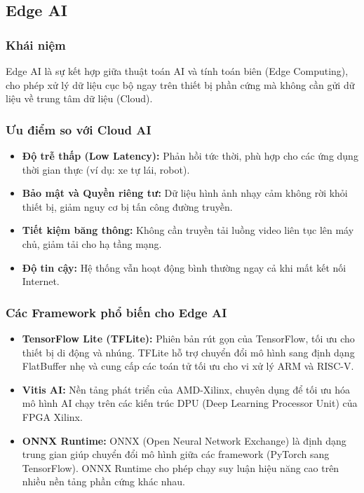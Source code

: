 \subsection{Edge AI}

\subsubsection{Khái niệm}
Edge AI là sự kết hợp giữa thuật toán AI và tính toán biên (Edge Computing), cho phép xử lý dữ liệu cục bộ ngay trên thiết bị phần cứng mà không cần gửi dữ liệu về trung tâm dữ liệu (Cloud).

\subsubsection{Ưu điểm so với Cloud AI}
\begin{itemize}
    \item \textbf{Độ trễ thấp (Low Latency):} Phản hồi tức thời, phù hợp cho các ứng dụng thời gian thực (ví dụ: xe tự lái, robot).
    \item \textbf{Bảo mật và Quyền riêng tư:} Dữ liệu hình ảnh nhạy cảm không rời khỏi thiết bị, giảm nguy cơ bị tấn công đường truyền.
    \item \textbf{Tiết kiệm băng thông:} Không cần truyền tải luồng video liên tục lên máy chủ, giảm tải cho hạ tầng mạng.
    \item \textbf{Độ tin cậy:} Hệ thống vẫn hoạt động bình thường ngay cả khi mất kết nối Internet.
\end{itemize}

\subsubsection{Các Framework phổ biến cho Edge AI}
\begin{itemize}
    \item \textbf{TensorFlow Lite (TFLite):} Phiên bản rút gọn của TensorFlow, tối ưu cho thiết bị di động và nhúng. TFLite hỗ trợ chuyển đổi mô hình sang định dạng FlatBuffer nhẹ và cung cấp các toán tử tối ưu cho vi xử lý ARM và RISC-V.
    \item \textbf{Vitis AI:} Nền tảng phát triển của AMD-Xilinx, chuyên dụng để tối ưu hóa mô hình AI chạy trên các kiến trúc DPU (Deep Learning Processor Unit) của FPGA Xilinx.
    \item \textbf{ONNX Runtime:} ONNX (Open Neural Network Exchange) là định dạng trung gian giúp chuyển đổi mô hình giữa các framework (PyTorch sang TensorFlow). ONNX Runtime cho phép chạy suy luận hiệu năng cao trên nhiều nền tảng phần cứng khác nhau.
\end{itemize}


